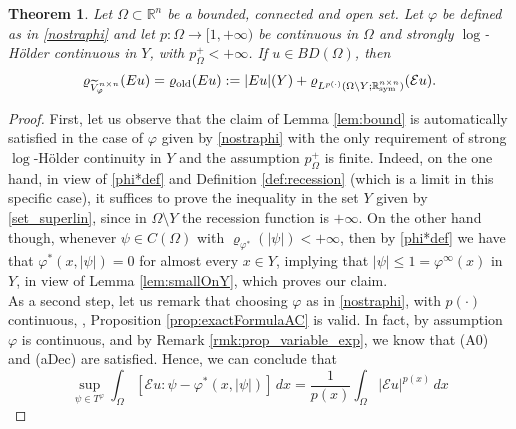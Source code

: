 \documentclass[a4paper,11pt,oneside,notitlepage]{article}
\newtheorem{theorem}{Theorem}[section]
\numberwithin{equation}{section}
\def\R{\mathbb{R}}
\def\sym{{\rm sym}}
\newcommand{\vphi}{\varphi}
\newcommand{\vrho}{\varrho}
\newcommand{\E}{\mathcal{E}}
\begin{document}
\begin{theorem}
\label{thm:eq_mod_px}
    Let $\Omega \subset \R^n$ be a bounded, connected and open set. Let $\vphi$ be defined as in \eqref{nostraphi} and let $p : \Omega \to [1, +\infty)$ be  continuous in $\Omega$ and strongly $\log$-H\"older continuous in $Y$, \color{black} with $p^+_\Omega < +\infty$. %
    If $u \in BD(\Omega)$, then 
    \begin{equation}
    \label{rho_old}
        \vrho_{\widetilde{V}^{n \times n}_\vphi}(Eu) = \vrho_{\textnormal{old}}(Eu) := |Eu|(Y) + \vrho_{L^{p(\cdot)}(\Omega \setminus Y; \R^{n \times n}_\sym)}(\E u).
    \end{equation}
\end{theorem}
\begin{proof}
    First, let us observe that the claim of Lemma \ref{lem:bound} is automatically satisfied in the case of $\vphi$ given by \eqref{nostraphi} with the only requirement of strong $\log$-H\"older continuity in $Y$ and \color{black} the assumption $p^+_\Omega$ is finite. Indeed, on the one hand, in view of \eqref{phi*def} and Definition \ref{def:recession} (which is a limit in this specific case), it suffices to prove the inequality in the set $Y$ given by \eqref{set_superlin}, since in $\Omega \setminus Y$ the recession function is $+\infty$. On the other hand though, whenever $\psi \in C(\Omega)$ with $\vrho_{\vphi^*}(|\psi|) < +\infty$, then by \eqref{phi*def} we have that $\vphi^*(x, |\psi|) = 0$ for almost every $x \in Y$, implying that $|\psi| \le 1=\vphi^\infty(x)$ in $Y$, in view of Lemma \ref{lem:smallOnY}, \color{black} which
    proves our claim.
    \\
    As a second step, let us remark that choosing $\vphi$ as in \eqref{nostraphi}, with $p(\cdot)$ continuous, \color{black}, Proposition \ref{prop:exactFormulaAC} is  valid. \color{black} %
    In fact, by assumption  $\vphi$ is continuous, and by \color{black} Remark \ref{rmk:prop_variable_exp}, we know that (A0) and (aDec) are satisfied.
   Hence, we can conclude that
    \begin{equation*}
        \sup_{\psi \in T^\vphi} \int_\Omega \left[\E u : \psi - \vphi^*(x,|\psi|) \right] \, dx = \frac{1}{p(x)} \int_\Omega |\E u|^{p(x)} \, dx

\end{equation*}
\end{proof}
\end{document}
